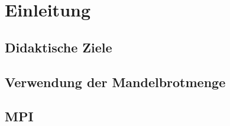 \section{Einleitung}

\subsection{Didaktische Ziele}

\subsection{Verwendung der Mandelbrotmenge}

\subsection{MPI}


